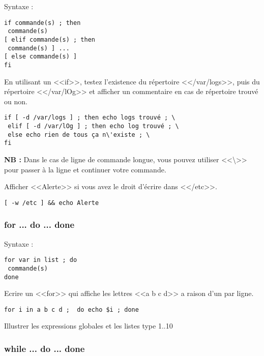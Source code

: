 \documentclass[11pt]{article}
\begin{document}
Syntaxe :

\begin{verbatim}
if commande(s) ; then
 commande(s)
[ elif commande(s) ; then
 commande(s) ] ...
[ else commande(s) ]
fi
\end{verbatim}

En utilisant un <<if>>, testez l'existence du répertoire <</var/logs>>, puis du répertoire <</var/lOg>> et afficher un commentaire en cas de répertoire trouvé ou non.

\begin{solution}
\begin{verbatim}
if [ -d /var/logs ] ; then echo logs trouvé ; \
 elif [ -d /var/lOg ] ; then echo log trouvé ; \
 else echo rien de tous ça n\'existe ; \
fi
\end{verbatim}
\end{solution}

\textbf{NB :} Dans le cas de ligne de commande longue, vous pouvez utiliser <<\textbackslash{}>> pour passer à la ligne et continuer votre commande.

Afficher <<Alerte>> si vous avez le droit d'écrire dans <</etc>>.

\begin{solution}
\begin{lstlisting}
[ -w /etc ] && echo Alerte
\end{lstlisting}
\end{solution}

\subsubsection{for ...  do ... done}

Syntaxe :

\begin{verbatim}
for var in list ; do
 commande(s)
done
\end{verbatim}

Ecrire un <<for>> qui affiche les lettres <<a b c d>> a raison d'un par ligne.

\begin{solution}
\begin{verbatim}
for i in a b c d ;  do echo $i ; done
\end{verbatim}
Illustrer les expressions globales et les listes type {1..10}
\end{solution}

\subsubsection{while ... do ... done}
\end{document}
